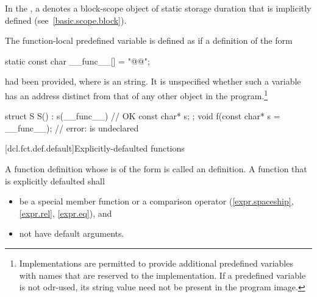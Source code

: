 \pnum
In the , a
 denotes a block-scope object of static
storage duration that is implicitly defined (see~\ref{basic.scope.block}).

\pnum
The function-local predefined variable  is
defined as if a definition of the form
\begin{codeblock}
static const char __func__[] = "@@";
\end{codeblock}
had been provided, where  is an  string.
It is unspecified whether such a variable has an address
distinct from that of any other object in the program.\footnote{Implementations are
permitted to provide additional predefined variables with names that are reserved to the
implementation. If a predefined variable is not
odr-used, its string value need not be present in the program image.}
\begin{example}
\begin{codeblock}
struct S {
  S() : s(__func__) { }             // OK
  const char* s;
};
void f(const char* s = __func__);   // error:  is undeclared
\end{codeblock}
\end{example}

[dcl.fct.def.default]{Explicitly-defaulted functions}%

\pnum
A function definition whose
is of the form
is called an  definition.
A function that is explicitly defaulted shall

\begin{itemize}
\item be a special member function or a comparison operator
(\ref{expr.spaceship}, \ref{expr.rel}, \ref{expr.eq}), and

\item not have default arguments.
\end{itemize}


